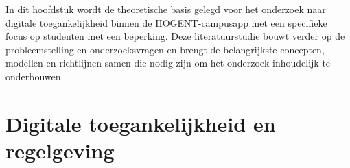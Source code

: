 




In dit hoofdstuk wordt de theoretische basis gelegd voor het onderzoek naar digitale toegankelijkheid binnen de HOGENT-campusapp met een specifieke focus op studenten met een beperking. Deze literatuurstudie bouwt verder op de probleemstelling en onderzoeksvragen en brengt de belangrijkste concepten, modellen en richtlijnen samen die nodig zijn om het onderzoek inhoudelijk te onderbouwen.

\section{Digitale toegankelijkheid en regelgeving}
\label{sec:toegankelijkheid-regelgeving}

